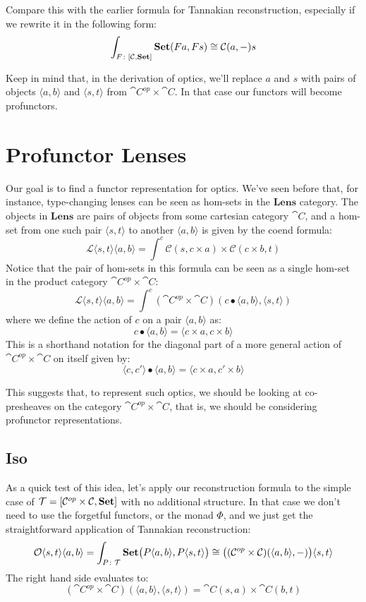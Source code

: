 \documentclass[DaoFP]{subfiles}
\begin{document}
Compare this with the earlier formula for Tannakian reconstruction, especially if we rewrite it in the following form:
\[ \int_{F \colon [\mathcal{C}, \mathbf{Set}]} \mathbf{Set} (F a, F s) \cong \mathcal{C}(a, -) s\]

Keep in mind that, in the derivation of optics, we'll replace $a$ and $s$ with pairs of objects $\langle a, b \rangle$ and $\langle s, t \rangle$  from $\cat C^{op} \times \cat C$. In that case our functors will become profunctors.

\section{Profunctor Lenses}

Our goal is to find a functor representation for optics. We've seen before that, for instance, type-changing lenses can be seen as hom-sets in the $\mathbf{Lens}$ category. The objects in $\mathbf{Lens}$ are pairs of objects from some cartesian category $\cat C$, and a hom-set from one such pair $\langle s, t \rangle$ to another  $\langle a, b \rangle$ is given by the coend formula:
\[ \mathcal{L}\langle s, t\rangle \langle a, b \rangle = \int^{c} \mathcal{C}(s, c \times a) \times  \mathcal{C}(c \times b, t) \]
Notice that the pair of hom-sets in this formula can be seen as a single hom-set in the product category $\cat C^{op} \times \cat C$:
\[  \mathcal{L}\langle s, t\rangle \langle a, b \rangle =  \int^{c} (\cat C^{op} \times \cat C )(c \bullet \langle a, b \rangle, \langle s, t \rangle)  \]
where we define the action of $c$ on a pair $\langle a, b \rangle$ as:
\[ c \bullet \langle a, b \rangle = \langle c \times a, c \times b \rangle \]
This is a shorthand notation for the diagonal part of a more general action of $\cat C^{op} \times \cat C$ on itself given by:
 \[ \langle c, c' \rangle \bullet \langle a, b \rangle = \langle c \times a, c' \times b \rangle \]


This suggests that, to represent such optics, we should be looking at co-presheaves on the category $\cat C^{op} \times \cat C$, that is, we should be considering profunctor representations. 

\subsection{Iso}
As a quick test of this idea, let's apply our reconstruction formula to the simple case of $\mathcal{T} = [\mathcal{C}^{op} \times \mathcal{C}, \mathbf{Set}]$ with no additional structure. In that case we don't need to use the forgetful functors, or the monad $\Phi$, and we just get the straightforward application of Tannakian reconstruction:
\[  \mathcal{O}\langle s, t\rangle \langle a, b \rangle =\int_{P \colon \mathcal{T}} \mathbf{Set} \big(P \langle a, b\rangle, P \langle s, t\rangle \big) \cong \big( (\mathcal{C}^{op} \times \mathcal{C}) (\langle a, b\rangle ,-) \big) \langle s, t\rangle \]
The right hand side evaluates to:
\[ (\cat C^{op} \times \cat C) (\langle a, b\rangle , \langle s, t\rangle) = \cat C (s, a) \times \cat C (b, t) \]
\end{document}
